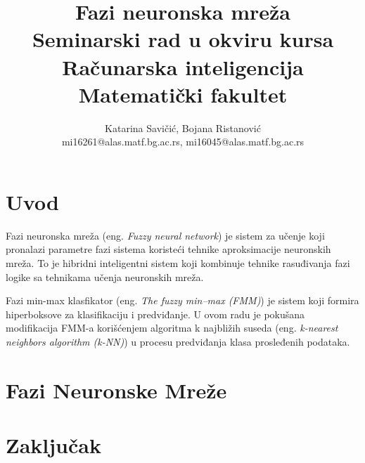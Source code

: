 \documentclass[a4paper]{article}
\begin{document}
\title{Fazi neuronska mreža\\ \small{Seminarski rad u okviru kursa\\Računarska inteligencija\\ Matematički fakultet}}

\author{Katarina Savičić, Bojana Ristanović\\ mi16261@alas.matf.bg.ac.rs, mi16045@alas.matf.bg.ac.rs}

\maketitle

\tableofcontents

\newpage

\section{Uvod}
\label{sec:uvod}

Fazi neuronska mreža (eng. \emph{Fuzzy neural network}) je sistem za učenje koji pronalazi parametre fazi sistema koristeći tehnike aproksimacije neuronskih mreža. To je hibridni inteligentni sistem koji kombinuje tehnike rasuđivanja fazi logike sa tehnikama učenja neuronskih mreža.\cite{fnn}

Fazi min-max klasfikator (eng. \emph{The fuzzy min–max (FMM)}) je sistem koji formira hiperboksove za klasifikaciju i predviđanje. U ovom radu je pokušana modifikacija FMM-a korišćenjem algoritma k najbližih suseda (eng. \emph{k-nearest neighbors algorithm (k-NN)}) u procesu predviđanja klasa prosleđenih podataka.
\section{Fazi Neuronske Mreže}
\label{neuronskemreze}

\section{Zaključak}
\label{sec:zakljucak}

\appendix
 


\newpage
\appendix
\end{document}
